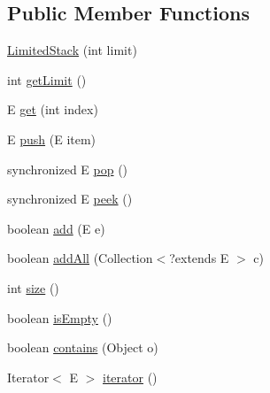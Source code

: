 \subsection*{Public Member Functions}
\begin{DoxyCompactItemize}
\item 
\hyperlink{classorg_1_1tzi_1_1use_1_1util_1_1collections_1_1_limited_stack_3_01_e_01_4_ace43c71a5e52d320d7d7a4dfa7f9edbd}{Limited\-Stack} (int limit)
\item 
int \hyperlink{classorg_1_1tzi_1_1use_1_1util_1_1collections_1_1_limited_stack_3_01_e_01_4_a5880d490a7ed1e86f704f66baa1b178c}{get\-Limit} ()
\item 
E \hyperlink{classorg_1_1tzi_1_1use_1_1util_1_1collections_1_1_limited_stack_3_01_e_01_4_af2946c499b41dc47e529c56dd778e5e0}{get} (int index)
\item 
E \hyperlink{classorg_1_1tzi_1_1use_1_1util_1_1collections_1_1_limited_stack_3_01_e_01_4_aa3439fd9585c4f3c53aa7d656d8d7940}{push} (E item)
\item 
synchronized E \hyperlink{classorg_1_1tzi_1_1use_1_1util_1_1collections_1_1_limited_stack_3_01_e_01_4_a19a8e24c0f2f26b4c82913154e63eb74}{pop} ()
\item 
synchronized E \hyperlink{classorg_1_1tzi_1_1use_1_1util_1_1collections_1_1_limited_stack_3_01_e_01_4_a048af67e8a68e79034b6e8a09490614a}{peek} ()
\item 
boolean \hyperlink{classorg_1_1tzi_1_1use_1_1util_1_1collections_1_1_limited_stack_3_01_e_01_4_a1c513f9fc31604cde382166844221909}{add} (E e)
\item 
boolean \hyperlink{classorg_1_1tzi_1_1use_1_1util_1_1collections_1_1_limited_stack_3_01_e_01_4_abf992603cfb9c634b56177914112ab59}{add\-All} (Collection$<$?extends E $>$ c)
\item 
int \hyperlink{classorg_1_1tzi_1_1use_1_1util_1_1collections_1_1_limited_stack_3_01_e_01_4_a968f52275ceca554bb5789bef25c91cc}{size} ()
\item 
boolean \hyperlink{classorg_1_1tzi_1_1use_1_1util_1_1collections_1_1_limited_stack_3_01_e_01_4_a9d785cb63a29c9a65c171d44c3a837a2}{is\-Empty} ()
\item 
boolean \hyperlink{classorg_1_1tzi_1_1use_1_1util_1_1collections_1_1_limited_stack_3_01_e_01_4_ae798547519f6ef432e42e185e0ae3093}{contains} (Object o)
\item 
Iterator$<$ E $>$ \hyperlink{classorg_1_1tzi_1_1use_1_1util_1_1collections_1_1_limited_stack_3_01_e_01_4_a19818b23651f646d4fac81fb14c989f4}{iterator} ()
\item 

\end{DoxyCompactItemize}
